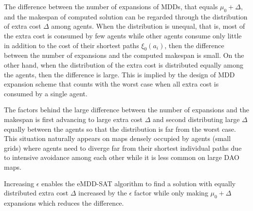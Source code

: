 \documentclass[jair,oneside,11pt]{article}
\begin{document}
The difference between the number of expansions of MDDs, that equals $\mu_0+\Delta$, and the makespan of computed solution can be regarded through the distribution of extra cost $\Delta$ among agents. When the distribution is unequal, that is, most of the extra cost is consumed by few agents while other agents consume only little in addition to the cost of their shortest paths $\xi_0(a_i)$, then the difference between the number of expansions and the computed makespan is small. On the other hand, when the distribution of the extra cost is distributed equally among the agents, then the difference is large. This is implied by the design of MDD expansion scheme that counts with the worst case when all extra cost is consumed by a single agent.

The factors behind the large difference between the number of expansions and the makespan is first advancing to large extra cost $\Delta$ and second distributing large $\Delta$ equally between the agents so that the distribution is far from the worst case. This situation naturally appears on maps densely occupied by agents (small grids) where agents need to diverge far from their shortest individual paths due to intensive avoidance among each other while it is less common on large DAO maps.

Increasing $\epsilon$ enables the eMDD-SAT algorithm to find a solution with equally distributed extra cost $\Delta$ increased by the $\epsilon$ factor while only making $\mu_0 + \Delta$ expansions which reduces the difference.
\end{document}

